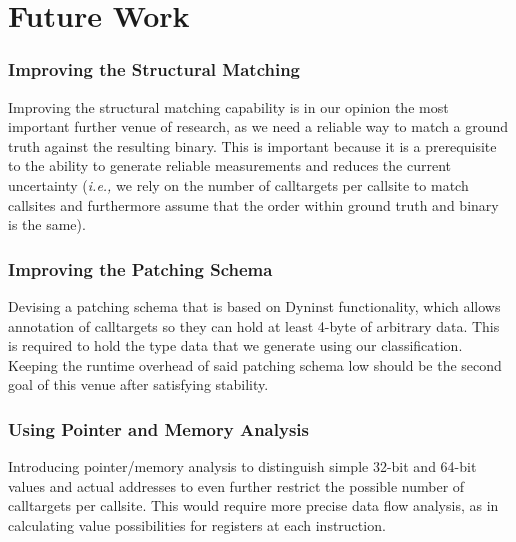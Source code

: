 \section{Future Work}
\label{chapter:Future_Work}

\subsubsection{Improving the Structural Matching} 
Improving the structural matching capability is in our opinion the most 
important further venue of research, as we need a reliable way to 
match a ground truth against the resulting binary. This is important 
because it is a prerequisite to the ability to generate reliable 
measurements and reduces the current uncertainty (\textit{i.e.,} we rely on the 
number of calltargets per callsite to match callsites and furthermore
assume that the order within ground truth and binary is the same).

\subsubsection{Improving the Patching Schema} 
Devising a patching schema
that is based on Dyninst functionality, 
which allows annotation of calltargets so they can hold at least 
4-byte of arbitrary data. This is required to hold the type data that
we generate using our classification. Keeping the runtime overhead
of said patching schema low should be the second goal of this venue 
after satisfying stability.


\subsubsection{Using Pointer and Memory Analysis} 
Introducing pointer/memory analysis
to distinguish simple 32-bit and 64-bit values and actual addresses to even further restrict the 
possible number of calltargets per callsite. This would require more 
precise data flow analysis, as in calculating value possibilities for 
registers at each instruction.
